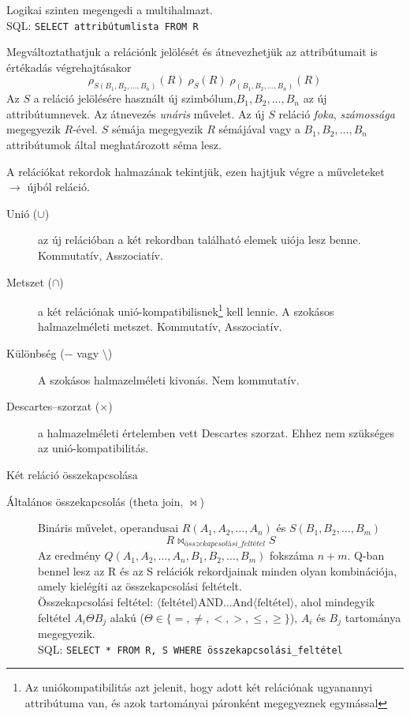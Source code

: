 \begin{description}[nosep]
	Logikai szinten megengedi a multihalmazt.\\
	SQL: \verb|SELECT attribútumlista FROM R|
	\item[Átnevezés ($\rho$)] Megváltoztathatjuk a relációnk jelölését és átnevezhetjük az attribútumait is értékadás végrehajtásakor
	$$\rho_{S(B_1,B_2,\dots,B_n)}(R)\;\rho_S(R)\;\rho_{(B_1,B_2,\dots,B_n)}(R)$$
	Az $S$ a reláció jelölésére használt új szimbólum,$ B_1, B_2, \dots, B_n$ az új attribútumnevek. Az átnevezés \emph{unáris} művelet. Az új $S$ reláció \emph{foka}, \emph{számossága} megegyezik $R$-ével. $S$ sémája megegyezik $R$ sémájával vagy a $B_1,B_2,\dots,B_n$ attribútumok által meghatározott séma lesz.
	\item[Halmazműveletek] A relációkat rekordok halmazának tekintjük, ezen hajtjuk végre a műveleteket $\rightarrow$ újból reláció.
	\begin{description}
		\item[Unió ($\cup$)] az új relációban a két rekordban található elemek uiója lesz benne. Kommutatív, Asszociatív.
		\item[Metszet ($\cap$)] a két relációnak unió-kompatibilisnek\footnote{Az uniókompatibilitás azt jelenit, hogy adott két relációnak ugyanannyi attribútuma van, és azok tartományai páronként megegyeznek egymással} kell lennie. A szokásos halmazelméleti metszet. Kommutatív, Asszociatív.
		\item[Különbség ($-$ vagy $\setminus$)] A szokásos halmazelméleti kivonás. Nem kommutatív.
		\item[Descartes--szorzat ($\times$)] a halmazelméleti értelemben vett Descartes szorzat. Ehhez nem szükséges az unió-kompatibilitás.
	\end{description}
	\item[Összekapcsolás (join)] Két reláció összekapcsolása
	\begin{description}
		\item[Általános összekapcsolás (theta join, $\bowtie$)] Bináris művelet, operandusai $R(A_1,A_2,\dots,A_n)$ és $S(B_1,B_2,\dots,B_m)$
		$$R\bowtie_{összekapcsolási\_feltétel}S$$
		Az eredmény $Q(A_1,A_2,\dots,A_n,B_1,B_2,\dots,B_m)$ fokszáma $n+m$. Q-ban bennel lesz az R és az S relációk rekordjainak minden olyan kombinációja, amely kielégíti az összekapcsolási feltételt.\\
		Összekapcsolási feltétel: $\langle\text{feltétel}\rangle\text{AND}\dots\text{And}\langle\text{feltétel}\rangle$, ahol mindegyik feltétel $A_i\Theta B_j$ alakú ($\Theta\in\{=,\neq,<,>,\leq,\geq \}$), $A_i$ és $B_j$ tartománya megegyezik.\\
		SQL: \verb|SELECT * FROM R, S WHERE összekapcsolási_feltétel|
		

\end{description}
\end{description}
